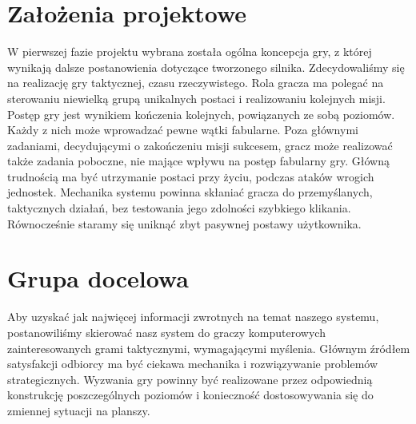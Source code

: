 \documentclass[licencjacka]{pracamgr}
\begin{document}
  \section{Założenia projektowe}
  W pierwszej fazie projektu wybrana została ogólna koncepcja gry, z której wynikają dalsze postanowienia dotyczące
  tworzonego silnika. Zdecydowaliśmy się na realizację gry taktycznej, czasu rzeczywistego. Rola gracza ma polegać
  na sterowaniu niewielką grupą unikalnych postaci i realizowaniu kolejnych misji. Postęp gry jest wynikiem kończenia
  kolejnych, powiązanych ze sobą poziomów. Każdy z nich może wprowadzać pewne wątki fabularne. Poza głównymi zadaniami,
  decydującymi o zakończeniu misji sukcesem, gracz może realizować także zadania poboczne, nie mające wpływu na
  postęp fabularny gry. Główną trudnością ma być utrzymanie postaci przy życiu, podczas ataków wrogich jednostek.
  Mechanika systemu powinna skłaniać gracza do przemyślanych, taktycznych działań, bez testowania jego zdolności
  szybkiego klikania. Równocześnie staramy się uniknąć zbyt pasywnej postawy użytkownika.

  \section{Grupa docelowa}
  Aby uzyskać jak najwięcej informacji zwrotnych na temat naszego systemu, postanowiliśmy skierować nasz system do
  graczy komputerowych zainteresowanych grami taktycznymi, wymagającymi myślenia. Głównym źródłem satysfakcji
  odbiorcy ma być ciekawa mechanika i rozwiązywanie problemów strategicznych. Wyzwania gry powinny być realizowane przez
  odpowiednią konstrukcję poszczególnych poziomów i konieczność dostosowywania się do zmiennej sytuacji na planszy.
\end{document}
